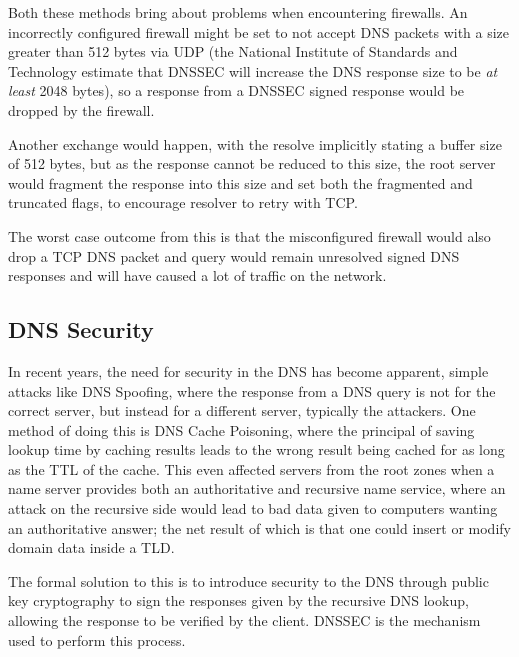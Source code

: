 \documentclass[11pt, a4paper]{article}
\begin{document}
Both these methods bring about problems when encountering firewalls. An 
incorrectly configured firewall might be set to not accept \gls{DNS} packets
with a size greater than 512 bytes via \gls{UDP} (the National Institute of Standards and 
Technology estimate that \gls{DNSSEC} will increase the \gls{DNS} response size
to be \textit{at least} 2048 bytes), so a response from a \gls{DNSSEC} signed 
response would be dropped by the firewall.

Another exchange would happen, with the resolve implicitly stating a buffer 
size of 512 bytes, but as the response cannot be reduced to this size, the root
server would fragment the response into this size and set both the fragmented 
and truncated flags, to encourage resolver to retry with \gls{TCP}.

The worst case outcome from this is that the misconfigured firewall would also
drop a \gls{TCP} \gls{DNS} packet and query would remain unresolved signed
\gls{DNS} responses and will have caused a lot of traffic on the network.



\subsection{DNS Security}
\label{subsec:dnssec}
In recent years, the need for security in the \gls{DNS} has become apparent, 
simple attacks like \gls{DNS} Spoofing, where the response from a \gls{DNS}
query is not for the correct server, but instead for a different server, 
typically the attackers. One method of doing this is \gls{DNS} Cache 
Poisoning\cite{davies2008cache}, where the principal of saving lookup time by
caching results leads to the wrong result being cached for as long as the 
\gls{TTL} of the cache. This even affected servers from the root zones when a
name server provides both an authoritative and recursive name service, where an
attack on the recursive side would lead to bad data given to computers wanting 
an authoritative answer; the net result of which is that one could insert or
modify domain data inside a \gls{TLD}. %

The formal solution to this is to introduce security to the \gls{DNS} through
public key cryptography to sign the responses given by the recursive \gls{DNS}
lookup, allowing the response to be verified by the client. \Gls{DNSSEC} is the
mechanism used to perform this process.
\end{document}
